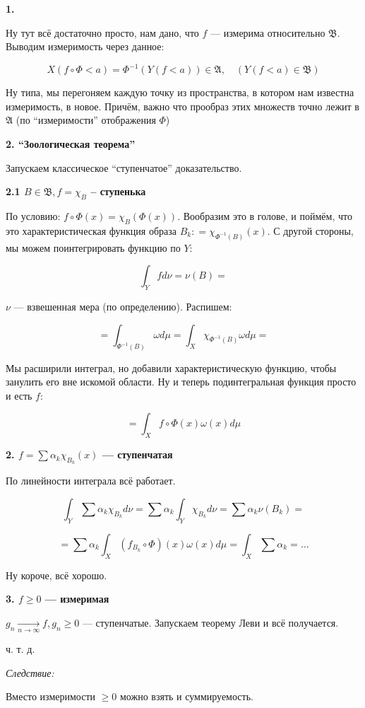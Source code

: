 \documentclass{article}
\def\goesto#1{\underset{#1}{\longrightarrow}}
\def\toinf#1{\goesto{#1 \rightarrow \infty}}
\def\ntoinf{\toinf{n}}
\begin{document}
\textbf{1.}

Ну тут всё достаточно просто, нам дано, что $f$ --- измерима относительно $\mathfrak{B}$. Выводим измеримость через данное:

\[X(f \circ \Phi < a) = \Phi^{-1}(Y(f < a)) \in \mathfrak{A}, \quad (Y(f < a) \in \mathfrak{B})\]

Ну типа, мы перегоняем каждую точку из пространства, в котором нам известна измеримость, в новое. Причём, важно что прообраз этих множеств точно лежит в $\mathfrak{A}$ (по ``измеримости'' отображения $\Phi$)

\textbf{2. ``Зоологическая теорема'' }

Запускаем классическое ``ступенчатое'' доказательство.

\textbf{2.1 $B \in \mathfrak{B}, f = \chi_{B}$ -- ступенька}

По условию: $f \circ \Phi(x) = \chi_{B}(\Phi(x))$. Вообразим это в голове, и поймём, что это характеристическая функция образа $B_k: = \chi_{\Phi^{-1}(B)}(x)$. С другой стороны, мы можем поинтегрировать функцию по $Y:$

\[\int_{Y} f d\nu = \nu(B) = \]

$\nu$ --- взвешенная мера (по определению). Распишем:

\[= \int_{\Phi^{-1}(B)} \omega d\mu = \int_{X} \chi_{\Phi^{-1}(B)} \omega d\mu = \]

Мы расширили интеграл, но добавили характеристическую функцию, чтобы занулить его вне искомой области. Ну и теперь подинтегральная функция просто и есть $f$:

\[ = \int_{X} f \circ \Phi(x) \omega(x) d\mu\]

\textbf{2. $f = \sum \alpha_k \chi_{B_k}(x)$ --- ступенчатая}

По линейности интеграла всё работает.

\[\int_{Y} \sum \alpha_k \chi_{B_k} d\nu = \sum \alpha_k \int_{Y} \chi_{B_k} d\nu = \sum \alpha_k \nu(B_k) =\]

\[= \sum \alpha_k \int_{X} (f_{B_k} \circ \Phi)(x) \omega(x) d\mu = \int_{X} \sum \alpha_k = \ldots\]

Ну короче, всё хорошо.

\textbf{3. $f \ge 0$ --- измеримая}

$g_n \ntoinf f, g_n \ge 0$ --- ступенчатые. Запускаем теорему Леви и всё получается.

ч. т. д. 

\textit{Следствие:}

Вместо измеримости $\ge 0$ можно взять и суммируемость.
\end{document}
